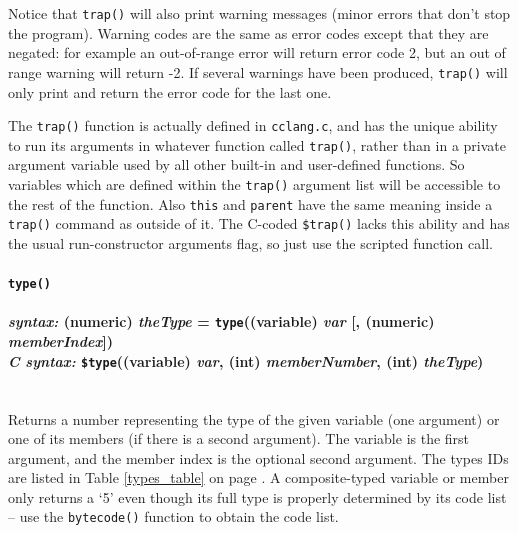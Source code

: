 \documentclass{article}
\begin{document}
\noindent Notice that \verb#trap()# will also print warning messages (minor errors that don't stop the program).  Warning codes are the same as error codes except that they are negated:  for example an out-of-range error will return error code 2, but an out of range warning will return -2.  If several warnings have been produced, \verb#trap()# will only print and return the error code for the last one.

The \verb#trap()# function is actually defined in \verb#cclang.c#, and has the unique ability to run its arguments in whatever function called \verb#trap()#, rather than in a private argument variable used by all other built-in and user-defined functions.  So variables which are defined within the \verb#trap()# argument list will be accessible to the rest of the function.  Also \verb#this# and \verb#parent# have the same meaning inside a \verb#trap()# command as outside of it.  The C-coded \verb#$trap()# lacks this ability and has the usual run-constructor arguments flag, so just use the scripted function call.







\paragraph{\texttt{type()}\\\\
\normalfont \emph{syntax: } (numeric) \emph{theType} = \texttt{type}((variable) \emph{var} [, (numeric) \emph{memberIndex}])\\
\normalfont \emph{C syntax: } \texttt{\$type}((variable) \emph{var}, (int) \emph{memberNumber},  (int) \emph{theType})\\\\}

Returns a number representing the type of the given variable (one argument) or one of its members (if there is a second argument).  The variable is the first argument, and the member index is the optional second argument.  The types IDs are listed in Table \ref{types_table} on page \pageref{types_table}.  A composite-typed variable or member only returns a `5' even though its full type is properly determined by its code list -- use the \verb#bytecode()# function to obtain the code list.\\
\end{document}
